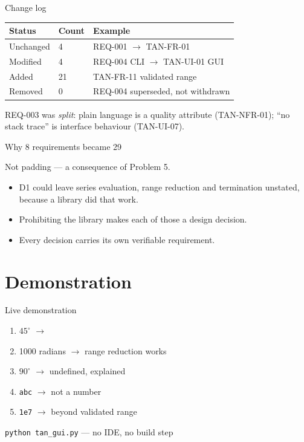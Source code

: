 \documentclass{beamer}
\begin{document}
\begin{frame}{Change log}
  \centering
  \small
  \begin{tabular}{lll}
    \toprule
    \textbf{Status} & \textbf{Count} & \textbf{Example} \\
    \midrule
    Unchanged & 4 & REQ-001 $\rightarrow$ TAN-FR-01 \\
    Modified  & 4 & REQ-004 CLI $\rightarrow$ TAN-UI-01 GUI \\
    Added     & 21 & TAN-FR-11 validated range \\
    Removed   & 0 & REQ-004 superseded, not withdrawn \\
    \bottomrule
  \end{tabular}
  \vfill
  \footnotesize
  REQ-003 was \emph{split}: plain language is a quality attribute
  (TAN-NFR-01); ``no stack trace'' is interface behaviour
  (TAN-UI-07).
\end{frame}

\begin{frame}{Why 8 requirements became 29}
  \begin{center}
    Not padding --- a consequence of Problem 5.
  \end{center}
  \vfill
  \begin{itemize}
    \item D1 could leave series evaluation, range reduction and
          termination unstated, because a library did that work.
    \item Prohibiting the library makes each of those a design
          decision.
    \item Every decision carries its own verifiable requirement.
  \end{itemize}
\end{frame}

\section{Demonstration}

\begin{frame}{Live demonstration}
  \begin{enumerate}
    \item $45^{\circ}$ \quad $\rightarrow$ 
    \item 1000 radians \quad $\rightarrow$ \quad range reduction works
    \item $90^{\circ}$ \quad $\rightarrow$ \quad undefined, explained
    \item \texttt{abc} \quad $\rightarrow$ \quad not a number
    \item \texttt{1e7} \quad $\rightarrow$ \quad beyond validated range
  \end{enumerate}
  \vfill
  \begin{center}
    \texttt{python tan\_gui.py} --- no IDE, no build step
  \end{center}
\end{frame}
\end{document}

